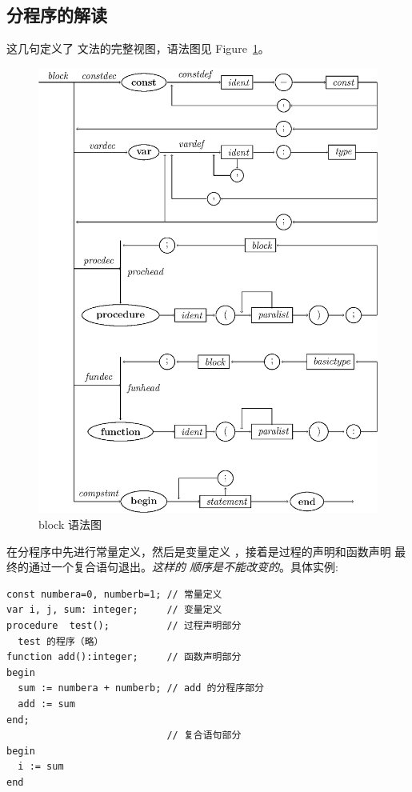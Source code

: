 \subsection{分程序的解读}










这几句定义了  文法的完整视图，语法图见 Figure~\ref{block}。
\begin{figure}[!h]
\begin{center}
    \includegraphics[scale=.8]{Figures/block.eps}
\end{center}
\caption{block 语法图}
\label{block}
\end{figure}
在分程序中先进行常量定义，然后是变量定义
 ，接着是过程的声明和函数声明
最终的通过一个复合语句退出。\emph{这样的
顺序是不能改变的}。具体实例:
\begin{verbatim}
const numbera=0, numberb=1; // 常量定义
var i, j, sum: integer;     // 变量定义
procedure  test();          // 过程声明部分
  test 的程序（略）
function add():integer;     // 函数声明部分
begin
  sum := numbera + numberb; // add 的分程序部分
  add := sum
end;
                            // 复合语句部分
begin
  i := sum
end
\end{verbatim}
